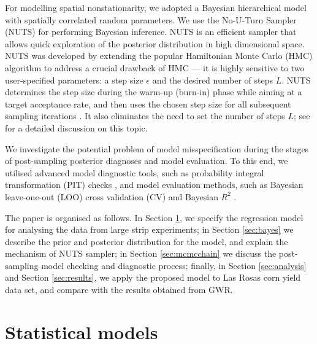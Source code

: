 \documentclass[a4paper]{article}   	%
\begin{document}
	
	For modelling spatial nonstationarity, we adopted a Bayesian hierarchical model with spatially correlated random parameters. We use the No-U-Turn Sampler (NUTS) \parencite{Hoffman2014NoUturn} for performing Bayesian inference. NUTS is an efficient sampler that allows quick exploration of the posterior distribution in high dimensional space. NUTS was developed by extending the popular Hamiltonian Monte Carlo (HMC) algorithm to address a crucial drawback of HMC --- it is highly sensitive to two user-specified parameters: a step size $\epsilon$ and the desired number of steps $L$. NUTS determines the step size during the warm-up (burn-in) phase while aiming at a target acceptance rate, and then uses the chosen step size for all subsequent sampling iterations \parencite{Monnahan2017Faster}. It also eliminates the need to set the number of steps $L$; see \cite{Hoffman2014NoUturn} for a detailed discussion on this topic. 
	
	
	We investigate the potential problem of model misspecification during the stages of post-sampling posterior diagnoses and model evaluation. To this end, we utilised advanced model diagnostic tools, such as probability integral transformation (PIT) checks \parencite{gabry2019Visualization}, and model evaluation methods, such as Bayesian leave-one-out (LOO) cross validation (CV)  \parencite{Vehtari2017Practical} and Bayesian $R^2$ \parencite{Gelman2019Rsquared}. 
	
	
	The paper is organised as follows. In Section \ref{sec:model}, we specify the regression model for analysing the data from large strip experiments; in Section \ref{sec:bayes} we describe the prior and posterior distribution for the model, and explain the mechanism of NUTS sampler; in Section \ref{sec:mcmcchain} we discuss the post-sampling model checking and diagnostic process; finally, in Section \ref{sec:analysis} and Section \ref{sec:results}, we apply the proposed model to Las Rosas corn yield data set, and compare with the results obtained from GWR.
	
	
	
	
	\section{Statistical models}\label{sec:model}
	
	
\end{document}
